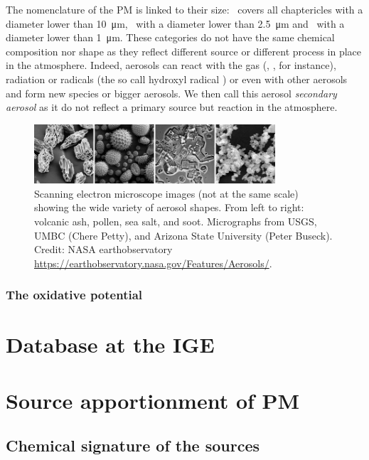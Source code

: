 \documentclass[a4paper,12pt]{memoir}
\newcommand{\PMdix}{\ce{PM10}}
\newcommand{\PMdc}{\ce{PM_{2.5}}}
\newcommand{\PMun}{\ce{PM1}}
\begin{document}
The nomenclature of the PM is linked to their size: \PMdix~covers all chaptericles with a
diameter lower than \SI{10}{\um}, \PMdc~with a diameter lower than \SI{2.5}{\um} and
\PMun~with a diameter lower than \SI{1}{\um}.  These categories do not have the same
chemical composition nor shape as they reflect different source or different process in
place in the atmosphere. Indeed, aerosols can react with the gas (,
,  for instance), radiation or radicals (the so call hydroxyl radical
) or even with other aerosols and form new species or bigger aerosols. We then
call this aerosol \emph{secondary aerosol} as it do not reflect a primary source but
reaction in the atmosphere.

\begin{figure}[h]
    \centering
    \includegraphics[width=0.8\textwidth]{aerosol_micrographs.jpg}
    \caption{Scanning electron microscope
        images (not at the same scale) showing the wide variety of aerosol shapes. From
        left to right: volcanic ash, pollen, sea salt, and soot. Micrographs from USGS,
        UMBC (Chere Petty), and Arizona State University (Peter Buseck).  Credit: NASA
        earthobservatory
    \url{https://earthobservatory.nasa.gov/Features/Aerosols/}.}
    \label{fig:micrography}
\end{figure}

\section{The oxidative potential}%
\label{sec:the_oxidative_potential}

\part{Database at the IGE}%
\label{cha:database_at_the_ige}


\part{Source apportionment of PM}%
\label{cha:source_apportionment_of_pm}

\chapter{Chemical signature of the sources}%
\label{prt:chemical_signature_of_the_sources}
\end{document}
